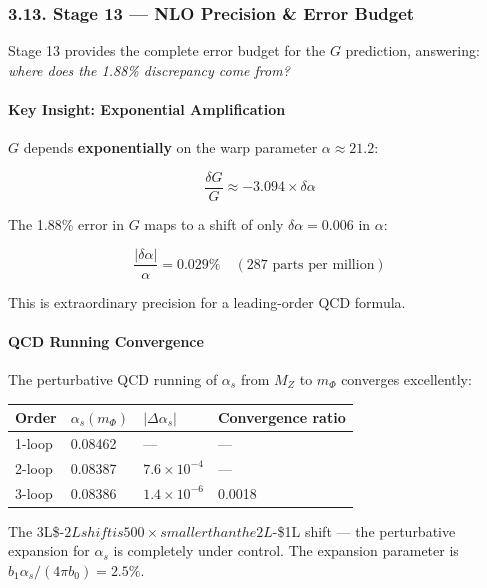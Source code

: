 \documentclass[
  11pt,
]{article}
\begin{document}
\bigskip

\hypertarget{stage-13-nlo-precision-error-budget}{%
\subsubsection{3.13. Stage 13 --- NLO Precision \& Error
Budget}\label{stage-13-nlo-precision-error-budget}}

Stage 13 provides the complete error budget for the \(G\) prediction,
answering: \emph{where does the 1.88\% discrepancy come from?}

\hypertarget{key-insight-exponential-amplification}{%
\paragraph{Key Insight: Exponential
Amplification}\label{key-insight-exponential-amplification}}

\(G\) depends \textbf{exponentially} on the warp parameter
\(\alpha \approx 21.2\):

\[\frac{\delta G}{G} \approx -3.094 \times \delta\alpha \tag{165}\]

The 1.88\% error in \(G\) maps to a shift of only
\(\delta\alpha = 0.006\) in \(\alpha\):

\[\frac{|\delta\alpha|}{\alpha} = 0.029\% \quad (\text{287 parts per million}) \tag{166}\]

This is extraordinary precision for a leading-order QCD formula.

\hypertarget{qcd-running-convergence}{%
\paragraph{QCD Running Convergence}\label{qcd-running-convergence}}

The perturbative QCD running of \(\alpha_s\) from \(M_Z\) to \(m_\Phi\)
converges excellently:

\begin{longtable}[]{@{}llll@{}}
\toprule
Order & \(\alpha_s(m_\Phi)\) & \(|\Delta\alpha_s|\) & Convergence
ratio\tabularnewline
\midrule
\endhead
1-loop & 0.08462 & --- & ---\tabularnewline
2-loop & 0.08387 & \(7.6 \times 10^{-4}\) & ---\tabularnewline
3-loop & 0.08386 & \(1.4 \times 10^{-6}\) & 0.0018\tabularnewline
\bottomrule
\end{longtable}

The 3L\$-\(2L shift is 500× smaller than the 2L\)-\$1L shift --- the
perturbative expansion for \(\alpha_s\) is completely under control. The
expansion parameter is \(b_1\alpha_s/(4\pi b_0) = 2.5\%\).
\end{document}
